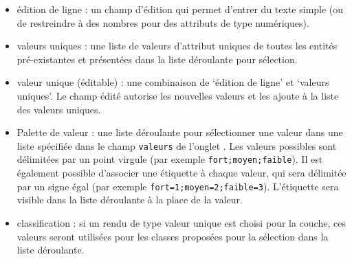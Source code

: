 \begin{itemize}
\item édition de ligne : un champ d'édition qui permet d'entrer du texte simple (ou de restreindre à des nombres pour des attributs de type numériques).
\item valeurs uniques : une liste de valeurs d'attribut uniques de toutes les entités pré-existantes et présentées dans la liste déroulante pour sélection.
\item valeur unique (éditable) : une combinaison de `édition de ligne' et `valeurs uniques'. Le champ édité autorise les nouvelles valeurs et les ajoute à la liste des valeurs uniques.
\item Palette de valeur : une liste déroulante pour sélectionner une valeur dans une liste spécifiée dans le champ \texttt{valeurs} de l'onglet . Les valeurs possibles sont délimitées par un point virgule (par exemple \verb|fort;moyen;faible|). Il est également possible d'associer une étiquette à chaque valeur, qui sera délimitée par un signe égal (par exemple \verb|fort=1;moyen=2;faible=3|). L'étiquette sera visible dans la liste déroulante à la place de la valeur.
\item classification :  si un rendu de type valeur unique est choisi pour la couche, ces valeurs seront utilisées pour les classes proposées pour la sélection dans la liste déroulante.

\end{itemize}
